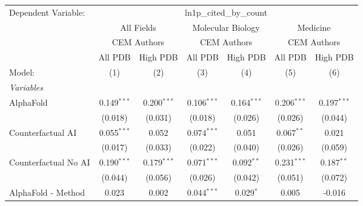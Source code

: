 \begingroup
\centering
\begin{tabular}{lcccccc}
   \tabularnewline \midrule \midrule
   Dependent Variable: & \multicolumn{6}{c}{ln1p\_cited\_by\_count}\\
 & \multicolumn{2}{c}{All Fields} & \multicolumn{2}{c}{Molecular Biology} & \multicolumn{2}{c}{Medicine} \\
\cmidrule(lr){2-3} \cmidrule(lr){4-5} \cmidrule(lr){6-7}
 & \multicolumn{2}{c}{CEM Authors} & \multicolumn{2}{c}{CEM Authors} & \multicolumn{2}{c}{CEM Authors} \\
\cmidrule(lr){2-3} \cmidrule(lr){4-5} \cmidrule(lr){6-7}
 & \multicolumn{1}{c}{All PDB} & \multicolumn{1}{c}{High PDB} & \multicolumn{1}{c}{All PDB} & \multicolumn{1}{c}{High PDB} & \multicolumn{1}{c}{All PDB} & \multicolumn{1}{c}{High PDB} \\
\cmidrule(lr){2-2} \cmidrule(lr){3-3} \cmidrule(lr){4-4} \cmidrule(lr){5-5} \cmidrule(lr){6-6} \cmidrule(lr){7-7}
   Model:                                                     & (1)           & (2)           & (3)           & (4)           & (5)           & (6)\\  
   \midrule
   \emph{Variables}\\
   AlphaFold                                                  & 0.149$^{***}$ & 0.200$^{***}$ & 0.106$^{***}$ & 0.164$^{***}$ & 0.206$^{***}$ & 0.197$^{***}$\\   
                                                              & (0.018)       & (0.031)       & (0.018)       & (0.026)       & (0.026)       & (0.044)\\   
   Counterfactual AI                                          & 0.055$^{***}$ & 0.052         & 0.074$^{***}$ & 0.051         & 0.067$^{**}$  & 0.021\\   
                                                              & (0.017)       & (0.033)       & (0.022)       & (0.040)       & (0.026)       & (0.059)\\   
   Counterfactual No AI                                       & 0.190$^{***}$ & 0.179$^{***}$ & 0.071$^{***}$ & 0.092$^{**}$  & 0.231$^{***}$ & 0.187$^{**}$\\   
                                                              & (0.044)       & (0.056)       & (0.026)       & (0.042)       & (0.051)       & (0.072)\\   
   AlphaFold - Method                                         & 0.023         & 0.002         & 0.044$^{***}$ & 0.029$^{*}$   & 0.005         & -0.016\\   

\end{tabular}
